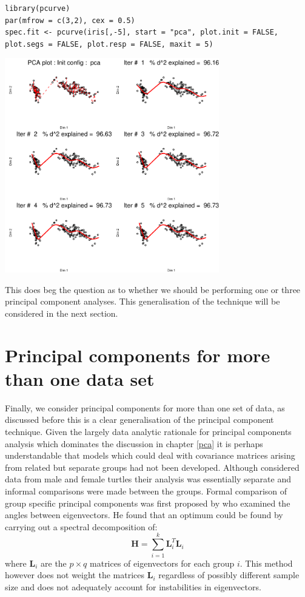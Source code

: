 \singlespacing
\begin{verbatim}
library(pcurve)
par(mfrow = c(3,2), cex = 0.5)
spec.fit <- pcurve(iris[,-5], start = "pca", plot.init = FALSE, plot.segs = FALSE, plot.resp = FALSE, maxit = 5)
\end{verbatim}
\onehalfspacing

\includegraphics[width = 0.7\textwidth]{images/irispcurve}

This does beg the question as to whether we should be performing one or three principal component analyses.   This generalisation of the technique will be considered in the next section.


\section{Principal components for more than one data set}
\label{cpc}

Finally, we consider principal components for more than one set of data, as discussed before this is a clear generalisation of the principal component technique.   Given the largely data analytic rationale for principal components analysis which dominates the discussion in chapter \ref{pca} it is perhaps understandable that models which could deal with covariance matrices arising from related but separate groups had not been developed.   Although \cite{Jolicoeur:1963} considered data from male and female turtles their analysis was essentially separate and informal comparisons were made between the groups.   Formal comparison of group specific principal components was first proposed by \cite{Krzanowski:1980} who examined the angles between eigenvectors.   He found that an optimum could be found by carrying out a spectral decomposition of:
\begin{equation}
\boldsymbol{H} = \sum_{i=1}^{k}\boldsymbol{L}_{i}^{T}\boldsymbol{L}_{i}
\end{equation}
where $\boldsymbol{L}_{i}$ are the $p \times q$ matrices of eigenvectors for each group $i$.   This method however does not weight the matrices $\boldsymbol{L}_{i}$ regardless of possibly different sample size and does not adequately account for instabilities in eigenvectors.

